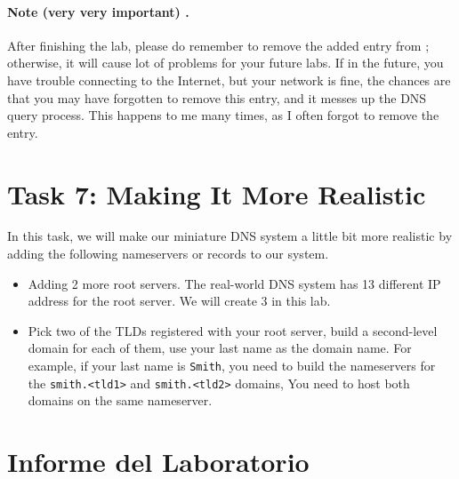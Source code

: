 \paragraph{ Note (very very important) .} 
After finishing the lab, please do remember to remove the added entry
from ; otherwise, it will 
cause lot of problems for your future labs. If in the future,
you have trouble connecting to the Internet, but your network is fine, 
the chances are that you may have forgotten to remove this entry, and it 
messes up the DNS query process. This happens to me many times,
as I often forgot to remove the entry.


\section{Task 7: Making It More Realistic}


In this task, we will make our miniature DNS system
a little bit more realistic by adding the following 
nameservers or records to our system. 


\begin{itemize}
\item Adding 2 more root servers. The real-world DNS system has 13 different 
IP address for the root server. We will create 3 in this lab.


\item Pick two of the TLDs registered with your root server, 
build a second-level domain for each of them, use your last name as the domain name. 
For example, if your last name is \texttt{Smith}, you need to build the 
nameservers for the \texttt{smith.<tld1>} and \texttt{smith.<tld2>} domains,
You need to host both domains on the same nameserver. 
\end{itemize}





 


\section{Informe del Laboratorio}


